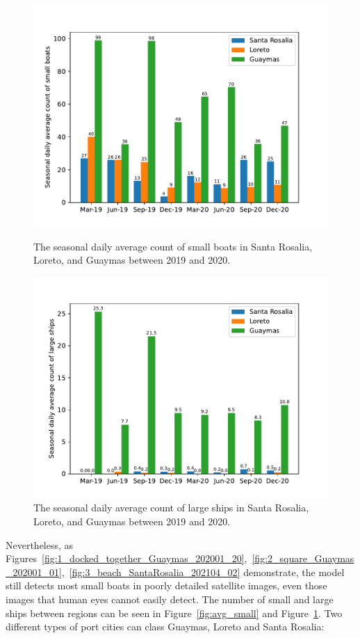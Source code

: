 \begin{figure}[t]
    \center
    \includegraphics[width=\columnwidth]{img/avg_small.pdf}
    \caption{The seasonal daily average count of small boats in Santa Rosalia, Loreto, and Guaymas between 2019 and 2020.}
    \label{fig:avg_small}

    \center
    \includegraphics[width=\columnwidth]{img/avg_big.pdf}
    \caption{The seasonal daily average count of large ships in Santa Rosalia, Loreto, and Guaymas between 2019 and 2020.}
    \label{fig:avg_big}
\end{figure}

Nevertheless, as Figures~\ref{fig:1_docked_together_Guaymas_202001_20},~\ref{fig:2_square_Guaymas_202001_01},~\ref{fig:3_beach_SantaRosalia_202104_02} demonstrate, the model still detects most small boats in poorly detailed satellite images, even those images that human eyes cannot easily detect. The number of small and large ships between regions can be seen in Figure~\ref{fig:avg_small} and Figure~\ref{fig:avg_big}. Two different types of port cities can class Guaymas, Loreto and Santa Rosalia:


